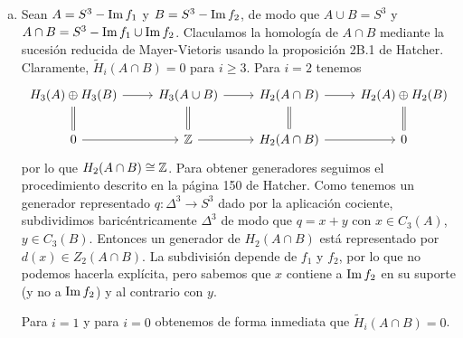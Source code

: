 \documentclass[twoside]{article}
\begin{document}
\begin{solucion}
\begin{enumerate}[(a)]
\item Sean $A=S^3-\operatorname{Im} f_1$ y $B=S^3-\operatorname{Im} f_2$, de modo que $A\cup B=S^3$ y $A\cap B=S^3-\operatorname{Im} f_1\cup \operatorname{Im} f_2$. Claculamos la homología de $A\cap B$ mediante la sucesión reducida de Mayer-Vietoris usando la proposición 2B.1 de Hatcher. Claramente, $\widetilde{H}_i(A\cap B)=0$ para $i\geq 3$. Para $i=2$ tenemos
\[
\begin{tikzcd}
H_3(A)\oplus H_3(B)\arrow[r]\arrow[d, equals] & H_3(A\cup B)\arrow[r]\arrow[d, equals] & H_2(A\cap B)\arrow[r]\arrow[d,equals] & H_2(A)\oplus H_2(B)\arrow[d, equals]\\
0 \arrow[r] & \Z\arrow[r] & H_2(A\cap B)\arrow[r] & 0
\end{tikzcd}
\]
por lo que $H_2(A\cap B)\cong \mathbb{Z}$. Para obtener generadores seguimos el procedimiento descrito en la página 150 de Hatcher. Como tenemos un generador representado $q:\Delta^3\to S^3$ dado por la aplicación cociente, subdividimos baricéntricamente $\Delta^3$ de modo que $q=x+y$ con $x\in C_3(A)$, $y\in C_3(B)$. Entonces un generador de $H_2(A\cap B)$ está representado por $d(x)\in Z_2(A\cap B)$. La subdivisión depende de $f_1$ y $f_2$, por lo que no podemos hacerla explícita, pero sabemos que $x$ contiene a $\operatorname{Im} f_2$ en su suporte (y no a $\operatorname{Im} f_2$) y al contrario con $y$. 

Para $i=1$ y para $i=0$ obtenemos de forma inmediata que $\widetilde{H}_i(A\cap B)=0$. 



\end{enumerate}
\end{solucion}
\end{document}
